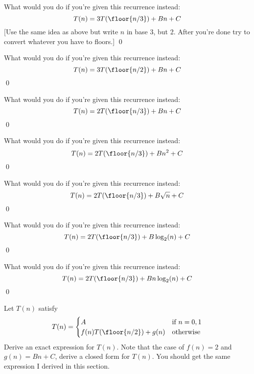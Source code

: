 \begin{ex}
What would you do if you're given this recurrence instead:
\[
T(n) = 3T(\floor{n/3}) + Bn + C
\]
[Use the same idea as above but write $n$ in base 3, but 2. 
After you're done
try to convert whatever you have to floors.]
\qed
\end{ex}

\begin{ex}
What would you do if you're given this recurrence instead:
\[
T(n) = 3T(\floor{n/2}) + Bn + C
\]
\qed
\end{ex}

\begin{ex}
What would you do if you're given this recurrence instead:
\[
T(n) = 2T(\floor{n/3}) + Bn + C
\]
\qed
\end{ex}

\begin{ex}
What would you do if you're given this recurrence instead:
\[
T(n) = 2T(\floor{n/3}) + Bn^2 + C
\]
\qed
\end{ex}

\begin{ex}
What would you do if you're given this recurrence instead:
\[
T(n) = 2T(\floor{n/3}) + B\sqrt{n} + C
\]
\qed
\end{ex}

\begin{ex}
What would you do if you're given this recurrence instead:
\[
T(n) = 2T(\floor{n/3}) + B\log_2(n) + C
\]
\qed
\end{ex}

\begin{ex}
What would you do if you're given this recurrence instead:
\[
T(n) = 2T(\floor{n/3}) + Bn\log_2(n) + C
\]
\qed
\end{ex}

\begin{ex}\mbox{}
\begin{itemize}
\li Let $T(n)$ satisfy
\[
T(n) =
\begin{cases}
A                          & \text{if $n = 0, 1$} \\
f(n) T(\floor{n/2}) + g(n) & \text{otherwise} 
\end{cases}
\]
Derive an exact expression for $T(n)$.
\li Note that the case of $f(n) = 2$ and $g(n) = Bn + C$,
derive a closed form for $T(n)$.
You should get the same expression I derived in this section.
\end{itemize}
\end{ex}

